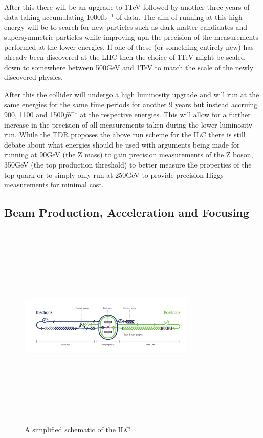 After this there will be an upgrade to 1TeV followed by another three years of data taking accumulating 1000fb${^{-1}}$ of data. The aim of running at this high energy will be to search for new particles such as dark matter candidates and supersymmetric particles while improving upn the precision of the measurements performed at the lower energies. If one of these (or something entirely new) has already been discovered at the \ac{LHC} then the choice of 1TeV might be scaled down to somewhere between 500GeV and 1TeV to match the scale of the newly discovered physics.

After this the collider will undergo a high luminosity upgrade and will run at the same energies for the same time periods for another 9 years but instead accruing 900, 1100 and 1500${fb^{-1}}$ at the respective energies. This will allow for a further increase in the precision of all measurements taken during the lower luminosity run.
While the \ac{TDR} proposes the above run scheme for the \ac{ILC} there is still debate about what energies should be used with arguments being made for running at 90GeV (the Z mass) to gain precision measurements of the Z boson, 350GeV (the top production threshold) to better measure the properties of the top quark or to simply only run at 250GeV to provide precision Higgs measurements for minimal cost.

\subsection{Beam Production, Acceleration and Focusing}
\label{ILC:BEAM}

\begin{figure}
  \centering
  \includegraphics[width=0.75\textwidth,height=10cm,keepaspectratio]{Experiments/fig/ILC_Simplified}
  \caption[Schematic Of The ILC]{A simplified schematic of the ILC}
  \label{Fig:ILCsimple}
\end{figure}

